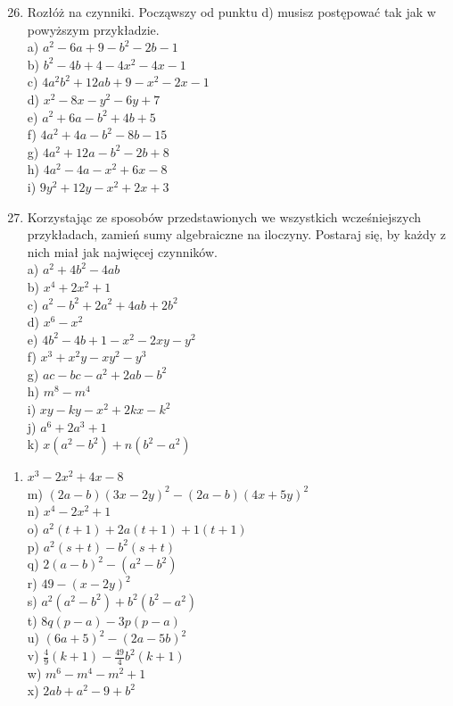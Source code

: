 \documentclass[10pt]{article}
\begin{document}
\begin{enumerate}
  \setcounter{enumi}{25}
  \item Rozłóż na czynniki. Począwszy od punktu d) musisz postępować tak jak w powyższym przykładzie.\\
a) \(a^{2}-6 a+9-b^{2}-2 b-1\)\\
b) \(b^{2}-4 b+4-4 x^{2}-4 x-1\)\\
c) \(4 a^{2} b^{2}+12 a b+9-x^{2}-2 x-1\)\\
d) \(x^{2}-8 x-y^{2}-6 y+7\)\\
e) \(a^{2}+6 a-b^{2}+4 b+5\)\\
f) \(4 a^{2}+4 a-b^{2}-8 b-15\)\\
g) \(4 a^{2}+12 a-b^{2}-2 b+8\)\\
h) \(4 a^{2}-4 a-x^{2}+6 x-8\)\\
i) \(9 y^{2}+12 y-x^{2}+2 x+3\)
  \item Korzystając ze sposobów przedstawionych we wszystkich wcześniejszych przykładach, zamień sumy algebraiczne na iloczyny. Postaraj się, by każdy z nich miał jak najwięcej czynników.\\
a) \(a^{2}+4 b^{2}-4 a b\)\\
b) \(x^{4}+2 x^{2}+1\)\\
c) \(a^{2}-b^{2}+2 a^{2}+4 a b+2 b^{2}\)\\
d) \(x^{6}-x^{2}\)\\
e) \(4 b^{2}-4 b+1-x^{2}-2 x y-y^{2}\)\\
f) \(x^{3}+x^{2} y-x y^{2}-y^{3}\)\\
g) \(a c-b c-a^{2}+2 a b-b^{2}\)\\
h) \(m^{8}-m^{4}\)\\
i) \(x y-k y-x^{2}+2 k x-k^{2}\)\\
j) \(a^{6}+2 a^{3}+1\)\\
k) \(x\left(a^{2}-b^{2}\right)+n\left(b^{2}-a^{2}\right)\)
\end{enumerate}

\begin{enumerate}
  \item \(x^{3}-2 x^{2}+4 x-8\)\\
m) \((2 a-b)(3 x-2 y)^{2}-(2 a-b)(4 x+5 y)^{2}\)\\
n) \(x^{4}-2 x^{2}+1\)\\
o) \(a^{2}(t+1)+2 a(t+1)+1(t+1)\)\\
p) \(a^{2}(s+t)-b^{2}(s+t)\)\\
q) \(2(a-b)^{2}-\left(a^{2}-b^{2}\right)\)\\
r) \(49-(x-2 y)^{2}\)\\
s) \(a^{2}\left(a^{2}-b^{2}\right)+b^{2}\left(b^{2}-a^{2}\right)\)\\
t) \(8 q(p-a)-3 p(p-a)\)\\
u) \((6 a+5)^{2}-(2 a-5 b)^{2}\)\\
v) \(\frac{4}{9}(k+1)-\frac{49}{4} b^{2}(k+1)\)\\
w) \(m^{6}-m^{4}-m^{2}+1\)\\
x) \(2 a b+a^{2}-9+b^{2}\)
\end{enumerate}
\end{document}
